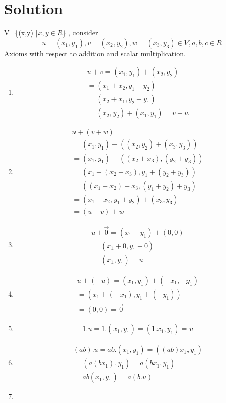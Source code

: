 \documentclass[journal,12pt,twocolumn]{IEEEtran}
\begin{document}
\section{Solution}
V=\{(x,y) $\vert x,y \in R$\} , consider $$u = (x_1,y_1) , v = (x_2,y_2) , w = (x_3,y_3) \in V , a,b,c \in R$$ Axioms with respect to addition and scalar multiplication.
\begin{enumerate}
 \item 
 \begin{align}
 u+v = (x_1,y_1)+(x_2,y_2)\\
     = (x_1+x_2,y_1+y_2)\\
     = (x_2+x_1,y_2+y_1)\\
     = (x_2,y_2)+(x_1,y_1)
     = v + u 
 \end{align}
 \item 
\begin{align}
u+(v+w)\\=(x_1,y_1)+((x_2,y_2)+(x_3,y_3))\\
=(x_1,y_1)+((x_2+x_3),(y_2+y_3))\\
=(x_1+(x_2+x_3),y_1+(y_2+y_3))\\
=((x_1+x_2)+x_3,(y_1+y_2)+y_3)\\
=(x_1+x_2,y_1+y_2)+(x_3,y_3)\\
=(u+v)+w 
 \end{align}
 \item 
 \begin{align}
 u+\vec{0} = (x_1+y_1)+(0,0)\\
     = (x_1+0,y_1+0)\\
     =(x_1,y_1)=u
 \end{align}
 \item 
 \begin{align}
 u + (-u) = (x_1,y_1)+(-x_1,-y_1)\\
          = (x_1+(-x_1),y_1+(-y_1))\\
          = (0 , 0) = \vec{0} 
 \end{align}
 \item 
 \begin{align}
 1.u = 1.(x_1,y_1) = (1.x_1,y_1) = u 
 \end{align}
 \item 
 \begin{align}
  (ab).u = ab.(x_1,y_1)=((ab)x_1,y_1)\\
  =(a(bx_1),y_1)=a(bx_1,y_1)\\
  =ab(x_1,y_1)=a(b.u)
 \end{align}
 \item 

\end{enumerate}
\end{document}
